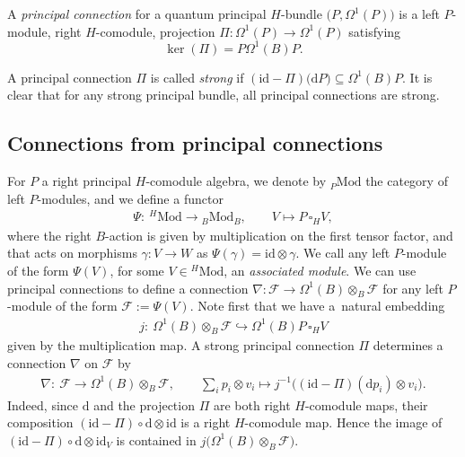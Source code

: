 \documentclass[10pt,a4paper]{amsart}
\numberwithin{equation}{section}
\begin{document}
\begin{defn}
A {\em principal connection} for a quantum principal $H$-bundle $\big(P,\Omega^1(P)\big)$ is a left $P$-module, right $H$-comodule, projection $\Pi\colon \Omega^1(P) \to \Omega^1(P)$ satisfying
\[
\ker(\Pi) = P\Omega^1(B)P.
\]
\end{defn}
A principal connection $\Pi$ is called {\em strong} if $(\mathrm{id} - \Pi) \big(\mathrm{d} P\big) \subseteq \Omega^1(B)P$. It is clear that for any strong principal bundle, all principal connections are strong.

\subsection{Connections from principal connections} \label{subsection:ConnFromPrinCs}

For $P$ a right principal $H$-comodule algebra, we denote by ${}_P\mathrm{Mod}$ the category of left $P$-modules, and we define a functor
\begin{gather*}
\Psi\colon \ {}^{H}\mathrm{Mod} \to {}_B\mathrm{Mod}_B, \qquad V \mapsto P \, \square_H V,
\end{gather*}
where the right $B$-action is given by multiplication on the first tensor factor, and that acts on morphisms $\gamma\colon V \to W$ as $\Psi(\gamma) = \mathrm{id} \otimes \gamma$. We call any left $P$-module of the form $\Psi(V)$, for some $V \in {}^H\mathrm{Mod}$, an \emph{associated module}. We can use principal connections to define a connection $\nabla\colon \mathcal{F} \to \Omega^1(B) \otimes_B \mathcal{F}$ for any left $P$-module of the form $\mathcal{F} := \Psi(V).$
Note first that we have a~natural embedding
\begin{gather*}
j\colon \ \Omega^1(B) \otimes_B \mathcal{F} \hookrightarrow \Omega^1(B)P \, \square_H V
\end{gather*}
given by the multiplication map.
A strong principal connection $\Pi$ determines a connection $\nabla$ on $\mathcal{F}$ by
\begin{gather*}%
 \nabla\colon \ \mathcal{F} \to \Omega^1(B) \otimes_B \mathcal{F}, \qquad \sum_i p_i \otimes v_i \mapsto j^{-1} \big((\mathrm{id} - \Pi)(\mathrm{d} p_i) \otimes v_i \big).
\end{gather*}
Indeed, since $\mathrm{d}$ and the projection $\Pi$ are both right \mbox{$H$-comodule} maps, their composition $(\mathrm{id} - \Pi) \allowbreak \circ \mathrm{d} \otimes \mathrm{id}$ is a right $H$-comodule map. Hence the image of $(\mathrm{id} - \Pi) \circ \mathrm{d}\otimes \mathrm{id}_V$ is contained in $j\big(\Omega^1(B) \otimes_B \mathcal{F}\big)$.
\end{document}
